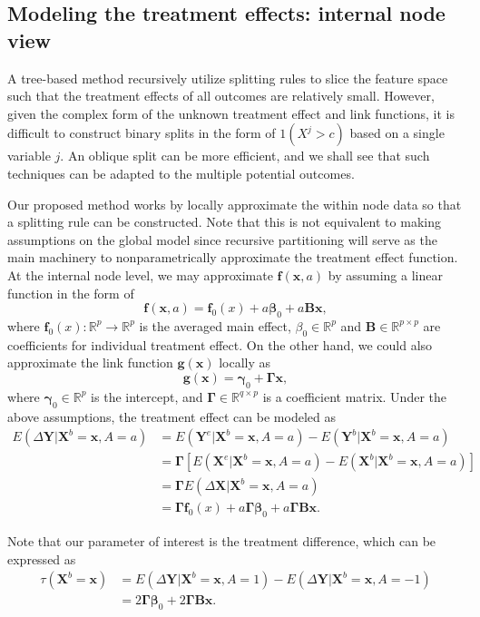 \documentclass[smallextended]{svjour3}
\begin{document}
\subsection{Modeling the treatment effects: internal node view}\label{Meth}

A tree-based method recursively utilize splitting rules to slice the feature space such that the treatment effects of all outcomes are relatively small. However, given the complex form of the unknown treatment effect and link functions, it is difficult to construct binary splits \citep{breiman2001random} in the form of $1(X^{j} > c)$ based on a single variable $j$. An oblique split \citep{menze2011oblique} can be more efficient, and we shall see that such techniques can be adapted to the multiple potential outcomes. 

Our proposed method works by locally approximate the within node data so that a splitting rule can be constructed. Note that this is not equivalent to making assumptions on the global model since recursive partitioning will serve as the main machinery to nonparametrically approximate the treatment effect function. At the internal node level, we may approximate $\bm f(\bm x,a)$ by assuming a linear function in the form of
$$\bm f(\bm x,a) = \bm f_0(x) + a \boldsymbol \beta_0 + a\bm B \bm x,$$
where $\bm f_0(x): \mathbb{R}^p \rightarrow \mathbb{R}^p$ is the averaged main effect, $\beta_0 \in \mathbb{R}^p$ and $\bm B \in \mathbb{R}^{p \times p}$ are coefficients for individual treatment effect. On the other hand, we could also approximate the link function $\bm g(\bm x)$ locally as 
$$\bm g(\bm x)= \bm \gamma_0 + \bm \Gamma \bm x,$$
where $\bm \gamma_0 \in \mathbb{R}^p$ is the intercept, and $\bm \Gamma \in \mathbb{R}^{q\times p}$ is a coefficient matrix. Under the above assumptions, the treatment effect can be modeled as
\begin{align*}
    E(\Delta \bm Y | \bm X^b = \bm x, A = a) &= E(\bm Y^e | \bm X^b = \bm x, A = a)-E(\bm Y^b | \bm X^b = \bm x, A = a)\\
    &=\bm \Gamma \left[E(\bm X^e | \bm X^b=\bm x, A = a) - E(\bm X^b | \bm X^b=\bm x,A = a)\right]\\
    &=\bm \Gamma E(\Delta \bm X | \bm X^b=\bm x, A = a)\\
    &=\bm \Gamma \bm f_0(x) +  a  \bm \Gamma \boldsymbol \beta_0 + a \bm \Gamma \bm B \bm x.
\end{align*} 

Note that our parameter of interest is the treatment difference, which can be expressed as
\begin{align}
    \tau( \bm X^b = \bm{x}) &= E(\Delta \bm{Y}|\bm X^b = \bm x, A = 1) - E(\Delta \bm{Y}|\bm X^b = \bm x, A = -1) \nonumber \\
    &= 2 \bm \Gamma \boldsymbol \beta_0 + 2 \bm \Gamma \bm B \bm x. \label{eqn:treatmenteffect}
\end{align}
\end{document}
